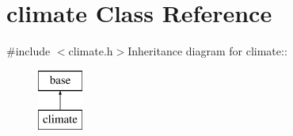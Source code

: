 \hypertarget{classclimate}{
\section{climate Class Reference}
\label{classclimate}
}


{\ttfamily \#include $<$climate.h$>$}Inheritance diagram for climate::\begin{figure}[H]
\begin{center}
\leavevmode
\includegraphics[height=2cm]{classclimate}
\end{center}
\end{figure}
